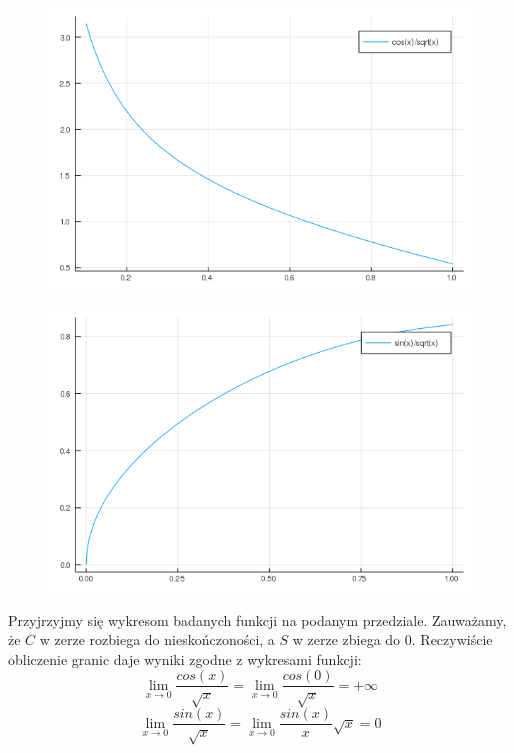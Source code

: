 \documentclass{article}
\begin{document}
\begin{figure}[ht]
    \includegraphics[scale=0.5]{WykresC.png}
    \label{wykresC}
\end{figure}
\begin{figure}[ht]
    \includegraphics[scale=0.5]{WykresS.png}
    \label{WykresS}
\end{figure}
Przyjrzyjmy się wykresom badanych funkcji na podanym przedziale. Zauważamy, że $C$ w zerze rozbiega do nieskończoności, a $S$ w zerze zbiega do $0$. Reczywiście obliczenie granic daje wyniki zgodne z wykresami funkcji:
\begin{equation}
\lim_{x\to 0}  \frac{cos(x)}{\sqrt{x}} = \lim_{x\to 0} \frac{cos(0)}{\sqrt{x}} = +\infty
\end{equation}
\begin{equation}
\lim_{x\to 0}  \frac{sin(x)}{\sqrt{x}} = \lim_{x\to 0}  \frac{sin(x)}{x} \sqrt{x} = 0
\end{equation}
\end{document}

